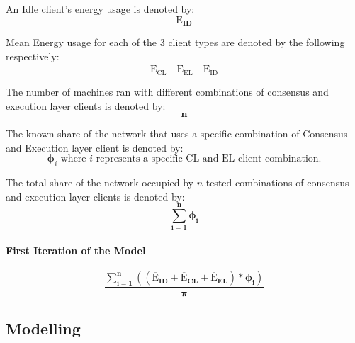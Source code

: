  An Idle client's energy usage is denoted by: \begin{equation*}
    \boldsymbol{\mathrm{E}_{ID}}
\end{equation*} 

Mean Energy usage for each of the 3 client types are denoted by the following respectively: 
\begin{equation*}
  \boldsymbol{\mathrm{{\overline{E}}_{CL}}}\quad      \boldsymbol{\mathrm{{\overline{E}}_{EL}}}\quad  \boldsymbol{\mathrm{{\overline{E}}_{ID}}}   
\end{equation*}

The number of machines ran with different combinations of consensus and execution layer clients is denoted by:
\begin{equation*}
    \boldsymbol{n}
\end{equation*}

The known share of the network that uses a specific combination of Consensus and Execution layer client is denoted by:
\begin{equation*}
    \boldsymbol{\phi}_{i} \text{ where } {i} \text{ represents a specific CL and EL client combination.}
\end{equation*}

The total share of the network occupied by ${n}$ tested combinations of consensus and execution layer clients is denoted by:
\begin{equation*}
    \boldsymbol{\displaystyle\sum\limits_{i=1}^{n}{\phi_{i}}}
\end{equation*}

\paragraph{First Iteration of the Model}

\begin{equation}
\boldsymbol{\frac{\displaystyle\sum\limits_{i=1}^{n}{ \left({\left(\mathrm{\overline{E}}_{ID} + \mathrm{\overline{E}}_{CL} + \mathrm{\overline{E}}_{EL}\right)} * {\phi_{i}} \right)}}
 {\pi}}
\end{equation}



\subsection {Modelling }
